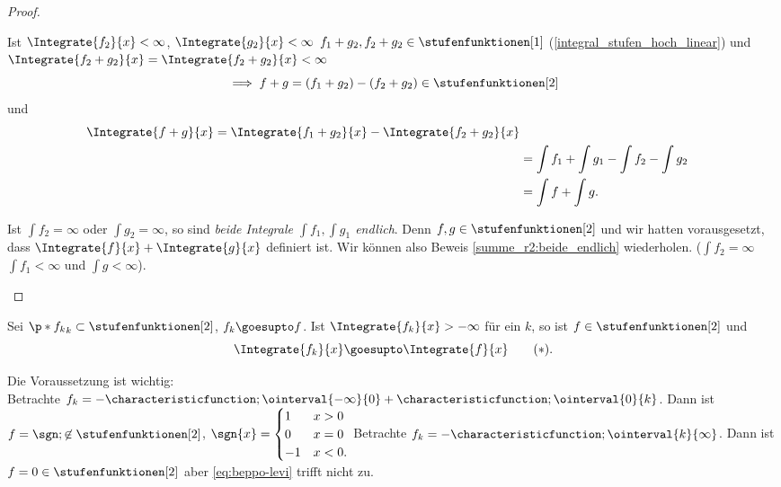 \begin{proof}
\begin{proofdescription}
    \begin{eigenschaftenenumerate}[ref=\rechtsklammer{\alph*}]
      \item \label{summe_r2:beide_endlich} Ist \( \Integrate{f_2}{x}<\infty \), \( \Integrate{g_2}{x}<\infty \) \timplies \( f_1+g_2, f_2+g_2\in \stufenfunktionen[1] \) (\ref{integral_stufen_hoch_linear})  und \( \Integrate{f_2+g_2}{x}=\Integrate{f_2+g_2}{x}<\infty \)
      \begin{equation*}
        \implies f+g=(f_1+g_2)-(f_2+g_2)\in \stufenfunktionen[2]
      \end{equation*}
      und 
      \begin{align*}
        \Integrate{f+g}{x}=\Integrate{f_1+g_2}{x}-\Integrate{f_2+g_2}{x}\\
        &=\int f_1+\int g_1-\int f_2-\int g_2\\
        &=\int f+\int g.
      \end{align*}
      \item Ist \( \int f_2=\infty \) oder \( \int g_2=\infty \), so sind \emph{beide Integrale \( \int f_1,\int g_1 \) endlich}. Denn \( f,g\in \stufenfunktionen[2] \) und wir hatten vorausgesetzt, dass \( \Integrate{f}{x}+\Integrate{g}{x} \) definiert ist. Wir können also Beweis \ref{summe_r2:beide_endlich} wiederholen. (\(\int f_2=\infty\) \timplies \( \int f_1<\infty \) und \( \int g <\infty \)).
    \end{eigenschaftenenumerate}
  \end{proofdescription}
  
\end{proof}
\begin{satz} \label{beppo-levi}
  Sei \( \p*{f_k}_k\subset \stufenfunktionen[2] \), \( f_k\goesupto f \). Ist \( \Integrate{f_k}{x}>-\infty \) für ein \( k \), so ist \( f\in \stufenfunktionen[2] \) und 
  \begin{equation*}
    \label{eq:beppo-levi} \Integrate{f_k}{x}\goesupto \Integrate{f}{x}\tag{\( * \)}.
  \end{equation*}
\end{satz}
\begin{bemerkung*}
  Die Voraussetzung ist wichtig:\\
  Betrachte \( f_k=-\characteristicfunction;{\ointerval{-\infty}{0}}+\characteristicfunction;{\ointerval{0}{k}} \). Dann ist \( f=\sgn;\not\in \stufenfunktionen[2] \), \( \sgn{x}=\begin{cases}
    1&x>0\\ 0&x=0\\ -1&x<0.
  \end{cases} \)
  Betrachte \( f_k=-\characteristicfunction;{\ointerval{k}{\infty}} \). Dann ist \( f=0\in \stufenfunktionen[2] \) aber \eqref{eq:beppo-levi} trifft nicht zu.
\end{bemerkung*}

